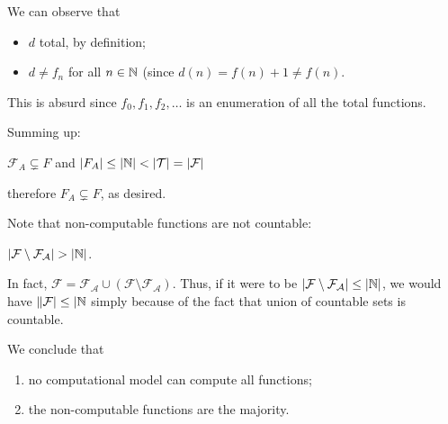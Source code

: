   We can observe that
  \begin{itemize}
  \item $d$ total, by definition;
  \item $d \neq f_n$ for all $n \in \mathbb{N}$ (since $d(n) = f(n)+1 \neq f(n)$.
  \end{itemize}
  This is absurd since $f_0, f_1, f_2, \ldots$ is an enumeration of all the total functions.

  \medskip

  Summing up:
  \begin{center}
    $\mathcal{F}_A \subsetneq F$ and
    $|F_A| \leq |\mathbb{N}| < |\mathcal{T}| = |\mathcal{F}|$
  \end{center}
  therefore $F_A \subsetneq F$, as desired.

  Note that non-computable functions are not countable:
  \begin{center}
    $|\mathcal{F} \setminus \mathcal{F}_{\mathcal{A}}| > |\mathbb{N}|$.
  \end{center}
  In fact, $\mathcal{F} = \mathcal{F}_{\mathcal{A}} \cup (\mathcal{F} \setminus \mathcal{F}_{\mathcal{A}})$. Thus, if it were to be $|\mathcal{F} \setminus \mathcal{F}_{\mathcal{A}}| \leq |\mathbb{N}|$, we would have $\|\mathcal{F}| \leq |\mathbb{N}$ simply because of the fact that union of countable sets is countable.

  We conclude that
  \begin{enumerate}
  \item no computational model can compute all functions;
  \item the non-computable functions are the majority.
  \end{enumerate}
